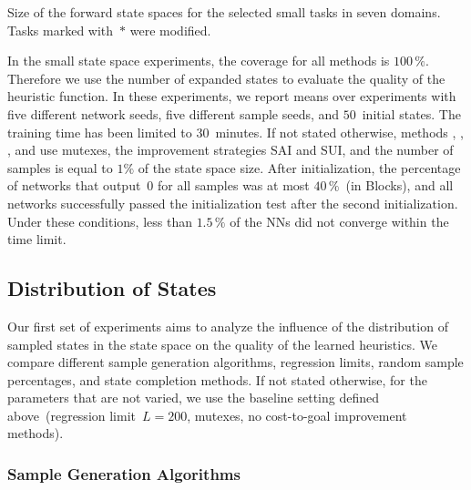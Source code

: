 \begin{table}[tb]
    \caption[Size of the forward state spaces for the selected domains.]{Size of the forward state spaces for the selected small tasks in seven domains. Tasks marked with~$*$ were modified.} 
    \label{tab:small-fss-size}
    \addmargin
    \centering
    
\end{table}

In the small state space experiments, the coverage for all methods is $100\,\%$. Therefore we use the number of expanded states to evaluate the quality of the heuristic function. In these experiments, we report means over experiments with five different network seeds, five different sample seeds, and $50$~initial states. The training time has been limited to $30$~minutes. If not stated otherwise, methods \bfs, \dfs, \rw, and \bfsrw use mutexes, the improvement strategies SAI and SUI, and the number of samples is equal to $1\%$ of the state space size. After initialization, the percentage of networks that output~$0$ for all samples was at most $40\,\%$~(in Blocks), and all networks successfully passed the initialization test after the second initialization. Under these conditions, less than $1.5\,\%$ of the NNs did not converge within the time limit.

\subsection{Distribution of States}
\label{sec:small-exps-distribution}

Our first set of experiments aims to analyze the influence of the distribution of sampled states in the state space on the quality of the learned heuristics. We compare different sample generation algorithms, regression limits, random sample percentages, and state completion methods. If not stated otherwise, for the parameters that are not varied, we use the baseline setting defined above~(regression limit~$L=200$, mutexes, no cost-to-goal improvement methods).

\subsubsection{Sample Generation Algorithms}
\label{sec:small-exps-algorithm}

